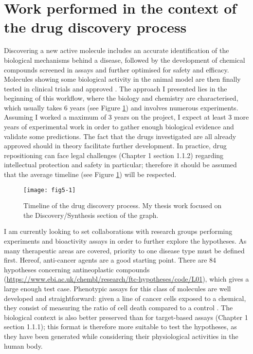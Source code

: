 \section{Work performed in the context of the drug discovery process}
Discovering a new active molecule includes an accurate identification of the biological mechanisms behind a disease, followed by the development of chemical compounds screened in assays and further optimised for safety and efficacy. Molecules showing some biological activity in the animal model are then finally tested in clinical trials and approved \citep{fishman2005pharmaceuticals} \citep{cooper2002optical}. The approach I presented lies in the beginning of this workflow, where the biology and chemistry are characterised, which usually takes 6 years (see Figure \ref{fig5-1}) and involves numerous experiments. Assuming I worked a maximum of 3 years on the project, I expect at least 3 more years of experimental work in order to gather enough biological evidence and validate some predictions.  The fact that the drugs investigated are all already approved should in theory facilitate further development. In practice, drug repositioning can face legal challenges (Chapter 1 section 1.1.2) regarding intellectual protection and safety in particular; therefore it should be assumed that the average timeline (see Figure \ref{fig5-1}) will be respected.

\begin{figure}[ht]
    \centering
    \texttt{[image: fig5-1]}
    \caption{Timeline of the drug discovery process. My thesis work focused on the Discovery/Synthesis section of the graph.}
    \label{fig5-1}
\end{figure}

I am currently looking to set collaborations with research groups performing experiments and bioactivity assays in order to further explore the hypotheses. As many therapeutic areas are covered, priority to one disease type must be defined first. Hereof, anti-cancer agents are a good starting point. There are 84 hypotheses concerning antineoplastic compounds (\url{https://www.ebi.ac.uk/chembl/research/ftc-hypotheses/code/L01}), which gives a large enough test case. Phenotypic assays for this class of molecules are well developed and straightforward: given a line of cancer cells exposed to a chemical, they consist of measuring the ratio of cell death compared to a control \citep{garnett2012systematic}. The biological context is also better preserved than for target-based assays (Chapter 1 section 1.1.1); this format is therefore more suitable to test the hypotheses, as they have been generated while considering their physiological activities in the human body.

